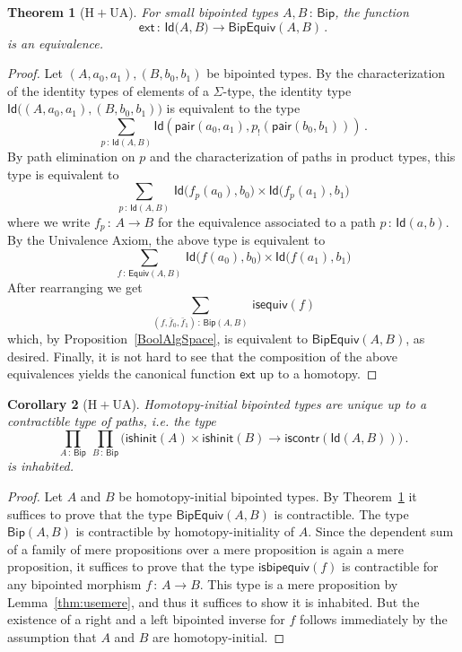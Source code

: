 \documentclass[10pt,a4paper,oneside,reqno]{amsart}
\theoremstyle{mythm}
\newtheorem{theorem}{Theorem}[section]
\newtheorem{corollary}[theorem]{Corollary}
\theoremstyle{mydef}
\theoremstyle{myrmk}
\newcommand{\co}{\,{:}\,}
\newcommand{\Hint}{\mathrm{H}}
\newcommand{\iscontr}{\mathsf{iscontr}}
\newcommand{\isequiv}{\mathsf{isequiv}}
\newcommand{\isbiphinit}{\mathsf{ishinit}}
\newcommand{\ext}{\mathsf{ext}}
\newcommand{\Id}{\mathsf{Id}}
\newcommand{\pair}{\mathsf{pair}}
\newcommand{\Bip}{\mathsf{Bip}}
\newcommand{\BipHom}{\mathsf{Bip}}
\newcommand{\isbipequiv}{\mathsf{isbipequiv}}
\newcommand{\BipEquiv}{\mathsf{BipEquiv}}
\begin{document}
\begin{theorem}[$\Hint + \mathrm{UA}$] \label{thm:bipunivalence}
For small bipointed types $A, B \co \Bip$, the function
\[ 
\ext \co \Id \big(A,B\big) \to  \BipEquiv(A,B) \, .
\] 
is an equivalence.
\end{theorem} 

\begin{proof} 
Let $ (A,a_0,a_1), (B,b_0,b_1)$ be bipointed types. By the characterization of the identity types
of  elements of a $\Sigma$-type, the 
identity type $\Id\big( (A,a_0,a_1),  (B,b_0,b_1)\big)$ is equivalent to  the type
\[
\sum_{p \co \Id(A,B)} \Id(\pair(a_0,a_1),  p_{!}(\pair(b_0,b_1))) \, .
\]
By path elimination on $p$ and the characterization of paths in product types, this type is equivalent to
\[ 
\sum_{p \co \Id(A,B)} \, \Id \big( f_p(a_0),  b_0\big) \times \Id \big( f_p(a_1) , b_1)
 \]
where we write $f_p \co A \to B$ for the equivalence associated to a path $p \co \Id(a,b)$.  By the Univalence Axiom,
the above type is equivalent to
\[ 
\sum_{f \co \mathsf{Equiv}(A,B)} \, \Id \big( f(a_0),  b_0\big) \times \Id \big( f(a_1) , b_1\big) \]
After rearranging we get
\[
\sum_{(f, \bar{f}_0, \bar{f}_1) \co \BipHom(A,B)} \, \isequiv(f)
\]
which, by Proposition~\ref{BoolAlgSpace}, is equivalent to $\BipEquiv(A,B)$, as desired. Finally, it is not hard to see that the composition of the above equivalences yields the canonical function $\ext$ up to a homotopy.
\end{proof} 

\begin{corollary}[$\Hint + \mathrm{UA}$] \label{BoolHInitIso} 
Homotopy-initial bipointed types are unique up to a contractible type of paths, i.e. the type
\[ 
\prod_{A \co \Bip} \, \prod_{ B \co \Bip}
\big( \isbiphinit(A) \times \isbiphinit(B) \to \iscontr(\Id(A,B)) \big) \, .
\] 
is inhabited.
\end{corollary}

\begin{proof} Let $A$ and $B$ be homotopy-initial bipointed types. 
By Theorem~\ref{thm:bipunivalence} it suffices to prove that the type $\BipEquiv(A,B)$ is contractible. The type 
$\BipHom( A, B)$ is contractible by homotopy-initiality of $A$. Since the dependent sum of a family of mere propositions over a mere proposition is again a mere proposition, it suffices to prove that the type $\isbipequiv(f)$ is contractible for any bipointed morphism $f \co A \to B$. This type is a mere proposition by Lemma~\ref{thm:usemere}, and thus it suffices to show it is inhabited. But the existence of a right and a left bipointed inverse for $f$ follows immediately
by the assumption that $A$ and $B$ are homotopy-initial.
\end{proof}
\end{document}
